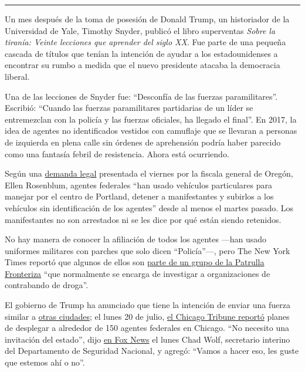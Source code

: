 \begin{center}\rule{0.5\linewidth}{\linethickness}\end{center}

Un mes después de la toma de posesión de Donald Trump, un historiador de
la Universidad de Yale, Timothy Snyder, publicó el libro superventas
\emph{Sobre la tiranía: Veinte lecciones que aprender del siglo XX}. Fue
parte de una pequeña cascada de títulos que tenían la intención de
ayudar a los estadounidenses a encontrar su rumbo a medida que el nuevo
presidente atacaba la democracia liberal.

Una de las lecciones de Snyder fue: ``Desconfía de las fuerzas
paramilitares''. Escribió: ``Cuando las fuerzas paramilitares
partidarias de un líder se entremezclan con la policía y las fuerzas
oficiales, ha llegado el final''. En 2017, la idea de agentes no
identificados vestidos con camuflaje que se llevaran a personas de
izquierda en plena calle sin órdenes de aprehensión podría haber
parecido como una fantasía febril de resistencia. Ahora está ocurriendo.

Según una
\href{http://opb-imgserve-production.s3-website-us-west-2.amazonaws.com/original/ag_rosenblum_xxxx_updated_complaint_1595086491349.pdf}{demanda
legal} presentada el viernes por la fiscala general de Oregón, Ellen
Rosenblum, agentes federales ``han usado vehículos particulares para
manejar por el centro de Portland, detener a manifestantes y subirlos a
los vehículos sin identificación de los agentes'' desde al menos el
martes pasado. Los manifestantes no son arrestados ni se les dice por
qué están siendo retenidos.

No hay manera de conocer la afiliación de todos los agentes ---han usado
uniformes militares con parches que solo dicen ``Policía''---, pero The
New York Times reportó que algunos de ellos son
\href{https://www.nytimes.com/2020/07/18/us/portland-protests.html}{parte
de un grupo de la Patrulla Fronteriza} ``que normalmente se encarga de
investigar a organizaciones de contrabando de droga''.

El gobierno de Trump ha anunciado que tiene la intención de enviar una
fuerza similar a
\href{https://www.motherjones.com/anti-racism-police-protest/2020/07/trump-border-patrol-cities-portland-chicago/}{otras
ciudades}; el lunes 20 de julio,
\href{https://www.chicagotribune.com/news/criminal-justice/ct-chicago-police-dhs-deployment-20200720-dftu5ychwbcxtg4ltarh5qnwma-story.html}{el
Chicago Tribune reportó} planes de desplegar a alrededor de 150 agentes
federales en Chicago. ``No necesito una invitación del estado'', dijo
\href{https://twitter.com/atrupar/status/1285224329878306817?s=20}{en
Fox News} el lunes Chad Wolf, secretario interino del Departamento de
Seguridad Nacional, y agregó: ``Vamos a hacer eso, les guste que estemos
ahí o no''.

